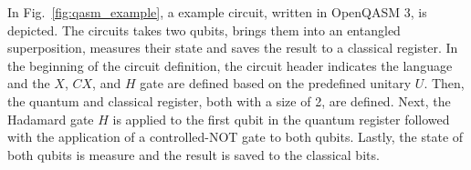 In Fig.~\ref{fig:qasm_example}, a example circuit, written in OpenQASM 3, is depicted. The circuits takes two qubits, brings them into an entangled superposition, measures their state and saves the result to a classical register. In the beginning of the circuit definition, the circuit header indicates the language and the $X$, $CX$, and $H$ gate are defined based on the predefined unitary $U$. Then, the quantum and classical register, both with a size of 2, are defined. Next, the Hadamard gate $H$ is applied to the first qubit in the quantum register followed with the application of a controlled-NOT gate to both qubits. Lastly, the state of both qubits is measure and the result is saved to the classical bits.